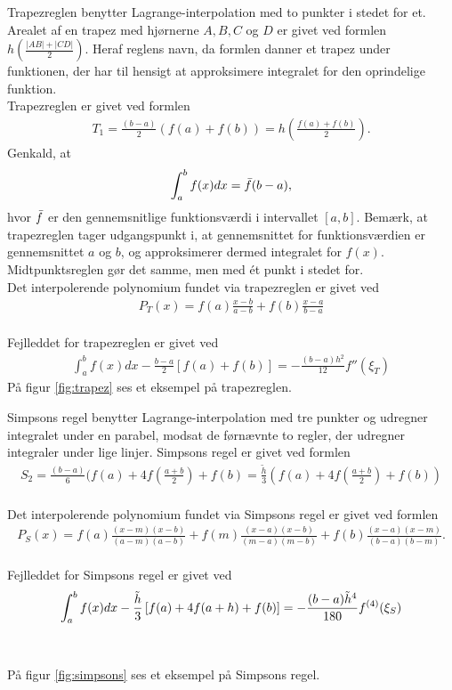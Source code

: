 Trapezreglen benytter Lagrange-interpolation med to punkter i stedet for et. 
Arealet af en trapez med hjørnerne $A, B, C$ og $D$ er givet ved formlen $h(\frac{|AB| + |CD|}{2})$. 
Heraf reglens navn, da formlen danner et trapez under funktionen, der har til hensigt at approksimere integralet for den oprindelige funktion. \\
Trapezreglen er givet ved formlen 
\begin{align*}
T_1 = \frac{(b-a)}{2}(f(a)+f(b))=h (\frac{f(a)+f(b)}{2}).
\end{align*}
Genkald, at 
\begin{align}
    \int_{a}^{b} f(x) dx = \Bar{f}(b-a),
\end{align}
hvor $\Bar{f}$ er den gennemsnitlige funktionsværdi i intervallet $[a,b]$.
Bemærk, at trapezreglen tager udgangspunkt i, at gennemsnittet for funktionsværdien er gennemsnittet $a$ og $b$, og approksimerer dermed integralet for $f(x)$. 
Midtpunktsreglen gør det samme, men med ét punkt i stedet for. 
\\
Det interpolerende polynomium fundet via trapezreglen er givet ved
\begin{align*}
P_{T}(x)=f(a)\frac{x-b}{a-b}+f(b)\frac{x-a}{b-a}       
\end{align*}
\\
Fejlleddet for trapezreglen er givet ved 
\begin{align*}
\int_{a}^{b}f(x)dx-\frac{b-a}{2}\left [ f(a)+f(b) \right ]=-\frac{(b-a)h^2}{12}{f}''(\xi_T)
\end{align*}
På figur \ref{fig:trapez} ses et eksempel på trapezreglen. 


Simpsons regel benytter Lagrange-interpolation med tre punkter og udregner integralet under en parabel, modsat de førnævnte to regler, der udregner integraler under lige linjer. 
Simpsons regel er givet ved formlen 
\begin{align*}
S_2 = \frac{(b-a)}{6}(f(a)+4f(\frac{a+b}{2})+f(b)=\frac{\widetilde{h}}{3}(f(a)+4f(\frac{a+b}{2})+f(b))
\end{align*}
\\
Det interpolerende polynomium fundet via Simpsons regel er givet ved formlen
\begin{align*}
P_{S}(x)=f(a)\frac{(x-m)(x-b)}{(a-m)(a-b)}+f(m)\frac{(x-a)(x-b)}{(m-a)(m-b)}+f(b)\frac{(x-a)(x-m)}{(b-a)(b-m)}.
\end{align*}
\\
Fejlleddet for Simpsons regel er givet ved 
\begin{align*}
\int_{a}^{b}f(x)dx-\frac{\Tilde{h}}{3}\left [ f(a)+4f(a+h) + f(b) \right ]=-\frac{(b-a)\Tilde{h}^4}{180}{f}^{(4)}(\xi_S)
\end{align*} \\\\
På figur \ref{fig:simpsons} ses et eksempel på Simpsons regel. 


